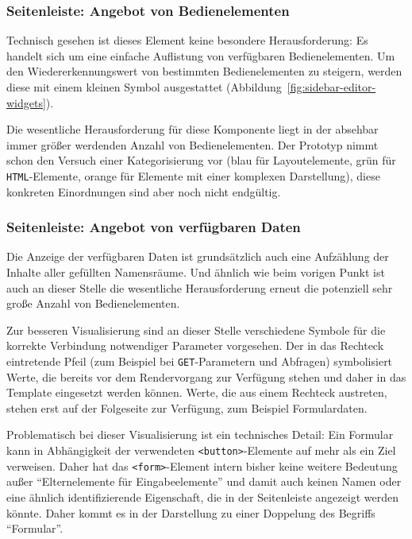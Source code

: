 \subsubsection{Seitenleiste: Angebot von Bedienelementen}

Technisch gesehen ist dieses Element keine besondere Herausforderung: Es handelt sich um eine einfache Auflistung von verfügbaren Bedienelementen. Um den Wiedererkennungswert von bestimmten Bedienelementen zu steigern, werden diese mit einem kleinen Symbol ausgestattet (Abbildung~\ref{fig:sidebar-editor-widgets}).

Die wesentliche Herausforderung für diese Komponente liegt in der absehbar immer größer werdenden Anzahl von Bedienelementen. Der Prototyp nimmt schon den Versuch einer Kategorisierung vor (blau für Layoutelemente, grün für \texttt{HTML}-Elemente, orange für Elemente mit einer komplexen Darstellung), diese konkreten Einordnungen sind aber noch nicht endgültig.

\subsubsection{Seitenleiste: Angebot von verfügbaren Daten}

Die Anzeige der verfügbaren Daten ist grundsätzlich auch eine Aufzählung der Inhalte aller gefüllten Namensräume. Und ähnlich wie beim vorigen Punkt ist auch an dieser Stelle die wesentliche Herausforderung erneut die potenziell sehr große Anzahl von Bedienelementen.

Zur besseren Visualisierung sind an dieser Stelle verschiedene Symbole für die korrekte Verbindung notwendiger Parameter vorgesehen. Der in das Rechteck eintretende Pfeil (zum Beispiel bei \texttt{GET}-Parametern und Abfragen) symbolisiert Werte, die bereits vor dem Rendervorgang zur Verfügung stehen und daher in das Template eingesetzt werden können. Werte, die aus einem Rechteck austreten, stehen erst auf der Folgeseite zur Verfügung, zum Beispiel Formulardaten.

Problematisch bei dieser Visualisierung ist ein technisches Detail: Ein Formular kann in Abhängigkeit der verwendeten \texttt{<button>}-Elemente auf mehr als ein Ziel verweisen. Daher hat das \texttt{<form>}-Element intern bisher keine weitere Bedeutung außer "`Elternelemente für Eingabeelemente"' und damit auch keinen Namen oder eine ähnlich identifizierende Eigenschaft, die in der Seitenleiste angezeigt werden könnte. Daher kommt es in der Darstellung zu einer Doppelung des Begriffs "`Formular"'.

